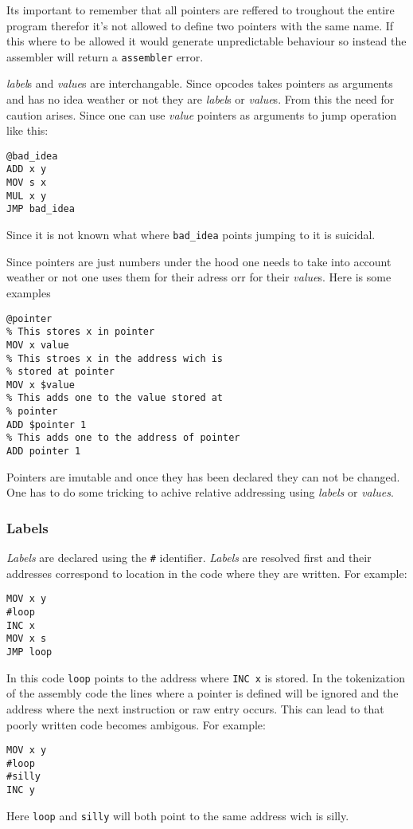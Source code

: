 \documentclass{article}
\newcommand{\V}{\verb}
\begin{document}
Its important to remember that all pointers are reffered to troughout the entire
program therefor it's not allowed to define two pointers with the same name. If
this where to be allowed it would generate unpredictable behaviour so instead
the assembler will return a \V+assembler+ error.

\emph{label}s and \emph{value}s are interchangable. Since opcodes takes pointers as arguments
and has no idea weather or not they are \emph{label}s or \emph{value}s. From this the need for
caution arises. Since one can use \emph{value} pointers as arguments to jump operation
like this:
\begin{verbatim}
@bad_idea
ADD x y
MOV s x
MUL x y
JMP bad_idea
\end{verbatim}
Since it is not known what where \V+bad_idea+ points jumping to it is suicidal.

Since pointers are just numbers under the hood one needs to take into account
weather or not one uses them for their adress orr for their \emph{value}s. Here is some
examples
\begin{verbatim}
@pointer
% This stores x in pointer
MOV x value
% This stroes x in the address wich is
% stored at pointer
MOV x $value
% This adds one to the value stored at 
% pointer
ADD $pointer 1
% This adds one to the address of pointer
ADD pointer 1
\end{verbatim}

Pointers are imutable and once they has been declared they can not be changed.
One has to do some tricking to achive relative addressing using \emph{labels} or
\emph{values}.


\subsubsection{Labels}
\emph{Labels} are declared using the \V+#+ identifier.
\emph{Labels} are resolved first and their addresses
correspond to location in the code where they are written. For example:
\begin{verbatim}
MOV x y
#loop
INC x
MOV x s
JMP loop
\end{verbatim}
In this code \V+loop+ points to the address where \V+INC x+ is stored. In the
tokenization of the assembly code the lines where a pointer is defined will be
ignored and the address where the next instruction or raw entry occurs. This can
lead to that poorly written code becomes ambigous. For example:
\begin{verbatim}
MOV x y
#loop
#silly
INC y
\end{verbatim}
Here \V+loop+ and \V+silly+ will both point to the same address wich is silly.
\end{document}
